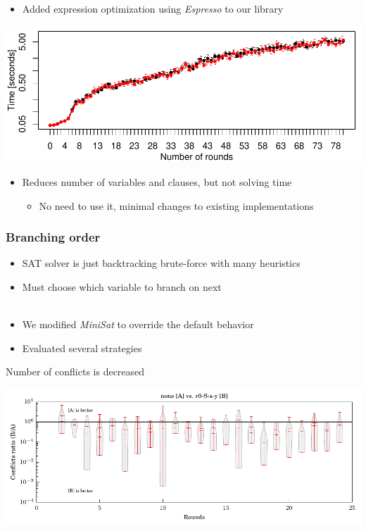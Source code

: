 \documentclass{beamer}
\let\olditem\item
\renewcommand{\item}{%
\olditem\vspace{4pt}}
\begin{document}
\begin{frame}
\begin{itemize}
\item Added expression optimization using \emph{Espresso} to our library
\end{itemize}
\includegraphics[width=\textwidth]{figures/opt-sha1/sha1-32bit-8bitref-cmp-espresso.pdf}
\begin{itemize}
\item Reduces number of variables and clauses, but not solving time
\begin{itemize}
	\item No need to use it, minimal changes to existing implementations
\end{itemize}
\end{itemize}
\end{frame}

\begin{frame}
\frametitle{Branching order}
\begin{itemize}
\item SAT solver is just backtracking brute-force with many heuristics
\item Must choose which variable to branch on next
~\\
~\\
\item We modified \emph{MiniSat} to override the default behavior
\item Evaluated several strategies
\end{itemize}
\end{frame}

\begin{frame}
Number of conflicts is decreased

\vfill

\includegraphics[width=\textwidth]{figures/bo-ex1/ratio-confl-none-r0sxy.pdf}
\end{frame}
\end{document}
